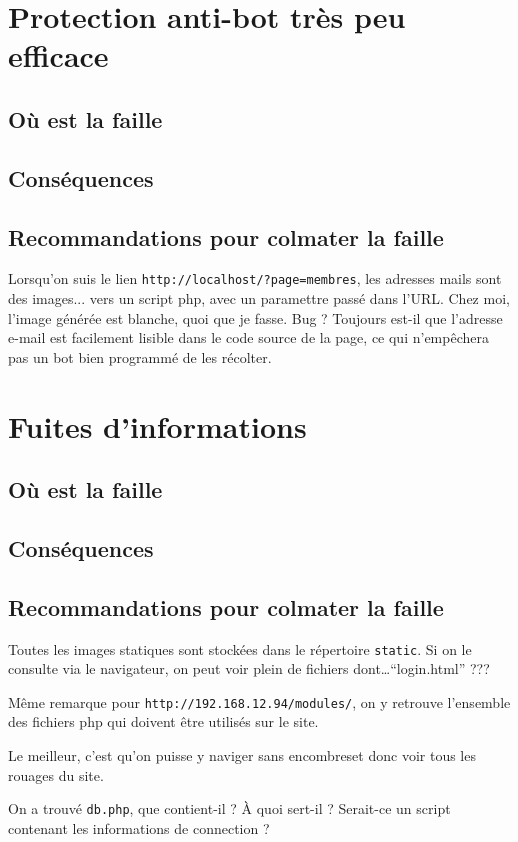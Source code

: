 \documentclass[oneside,10pt]{article}
\begin{document}
\section{Protection anti-bot tr\`es peu efficace}
\subsection{O\`u est la faille}
\subsection{Cons\'equences}
\subsection{Recommandations pour colmater la faille}
Lorsqu'on suis le lien \verb+http://localhost/?page=membres+, les adresses mails sont des images... vers un script php, avec un paramettre pass\'e dans l'URL.
Chez moi, l'image g\'en\'er\'ee est blanche, quoi que je fasse. Bug ?
Toujours est-il que l'adresse e-mail est facilement lisible dans le code source de la page, ce qui n'emp\^echera pas un bot bien programm\'e de les r\'ecolter.

\section{Fuites d'informations}
\subsection{O\`u est la faille}
\subsection{Cons\'equences}
\subsection{Recommandations pour colmater la faille}
Toutes les images statiques sont stock\'ees dans le r\'epertoire \verb+static+.
Si on le consulte via le navigateur, on peut voir plein de fichiers dont\ldots ``login.html'' ???

M\^eme remarque pour \verb+http://192.168.12.94/modules/+, on y retrouve l'ensemble des fichiers php qui doivent \^etre utilis\'es sur le site.

Le meilleur, c'est qu'on puisse y naviger sans encombreset donc voir tous les rouages du site.

On a trouv\'e \verb+db.php+, que contient-il ?
\`A quoi sert-il ?
Serait-ce un script contenant les informations de connection ?
\end{document}
